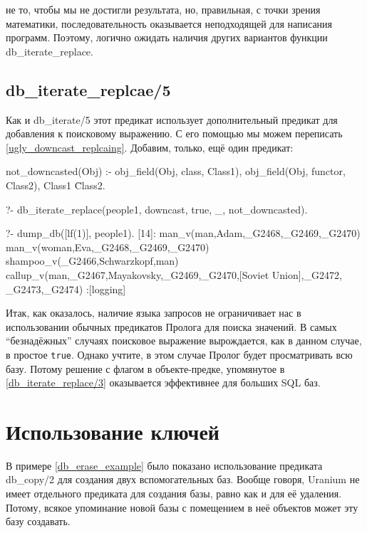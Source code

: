 \documentclass[a4paper]{book}
\def\ur{Uranium}
\begin{document}
не то, чтобы мы не достигли результата, но, правильная, с точки
зрения математики, последовательность оказывается неподходящей
для написания программ. Поэтому, логично ожидать наличия других
вариантов функции db_iterate_replace.

\subsection{db_iterate_replcae/5}

Как и db_iterate/5 этот предикат использует дополнительный
предикат для добавления к поисковому выражению. С его помощью мы
можем переписать \ref{ugly_downcast_replcaing}. Добавим, только,
ещё один предикат:

\begin{example}{}{}
not_downcasted(Obj) :- 
   obj_field(Obj, class, Class1),
   obj_field(Obj, functor, Class2),
   Class1 \= Class2.
\end{example}

\begin{example}{}{}
?- db_iterate_replace(people1, downcast, true, _, not_downcasted).

?- dump_db([lf(1)], people1).
[14]: man_v(man,Adam,_G2468,_G2469,_G2470) 
man_v(woman,Eva,_G2468,_G2469,_G2470) 
shampoo_v(_G2466,Schwarzkopf,man) 
callup_v(man,_G2467,Mayakovsky,_G2469,_G2470,[Soviet Union],_G2472,
_G2473,_G2474)                                                    
 :[logging]
\end{example}

Итак, как оказалось, наличие языка запросов не ограничивает нас в
использовании обычных предикатов Пролога для поиска значений. В
самых ``безнадёжных'' случаях поисковое выражение вырождается,
как в данном случае, в простое \verb|true|. Однако учтите, в этом
случае Пролог будет просматривать всю базу. Потому решение с
флагом в объекте-предке, упомянутое в \ref{db_iterate_replace/3}
оказывается эффективнее для больших SQL баз.

\section{Использование ключей}
\label{keys}

В примере \ref{db_erase_example} было показано использование
предиката db\_copy/2 для создания двух вспомогательных
баз. Вообще говоря, \ur{} не имеет отдельного предиката для
создания базы, равно как и для её удаления. Потому, всякое
упоминание новой базы с помещением в неё объектов может эту базу
создавать. 
\end{document}
